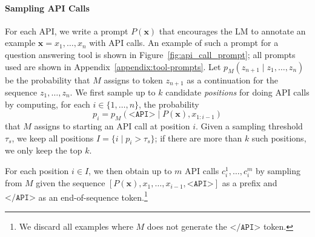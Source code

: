 \documentclass[11pt]{article}
\begin{document}
\begin{CJK*}{UTF8}{gbsn}
\paragraph{Sampling API Calls} For each API, we write a prompt $P(\mathbf{x})$ that encourages the LM to annotate an example $\mathbf{x} = x_1, \ldots, x_n$ with API calls. An example of such a prompt for a question answering tool is shown in Figure~\ref{fig:api_call_prompt}; all prompts used are shown in Appendix~\ref{appendix:tool-prompts}. Let $p_M(z_{n+1} \mid z_1, \ldots, z_n)$ be the probability that $M$ assigns to token $z_{n+1}$ as a continuation for the sequence $z_1, \ldots, z_n$. We first sample up to $k$ candidate \emph{positions} for doing API calls by computing, for each $i \in \{1, \ldots, n\}$, the probability
\[
p_i = p_M(\texttt{<API>} \mid P(\mathbf{x}), x_{1:i-1} )
\]
that $M$ assigns to starting an API call at position $i$. 
Given a sampling threshold $\tau_s$, we keep all positions $I = \{ i \mid p_i > \tau_s \}$; if there are more than $k$ such positions, we only keep the top $k$.

For each position $i \in I$, we then obtain up to $m$ API calls $c_i^1, \ldots, c_i^m$ by sampling from $M$ given the sequence $[P(\mathbf{x}), x_1, \ldots, x_{i-1}, \texttt{<API>}]$ as a prefix and $\texttt{</API>}$ as an end-of-sequence token.\footnote{We discard all examples where $M$ does not generate the $\texttt{</API>}$ token.} 


\end{CJK*}
\end{document}
